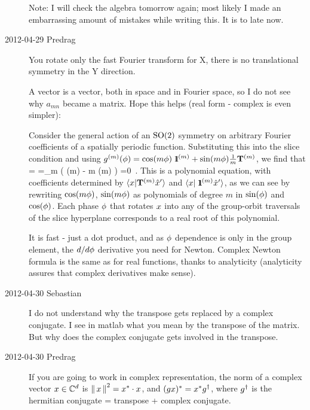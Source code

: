 \begin{description}
Note: I will check the algebra tomorrow again; most likely I made an
embarrassing amount of mistakes while writing this. It is to late now.

\item[2012-04-29 Predrag]
You rotate only the fast Fourier transform for X, there is no
translational symmetry in the Y direction.

A vector is a vector, both in space and in Fourier space, so I do not see
why $a_{mn}$ became a matrix. Hope this helps (real form - complex is even
simpler):

Consider the general action of an
$\textrm{SO}(2)$ symmetry on arbitrary Fourier coefficients of a spatially
periodic function. Substituting this into the slice
condition
and using $g^{(m)}({\bf \phi})=\cos(m{\bf \phi}){\ \hbox{{\rm 1}\kern-.6em\hbox{\rm 1}}}^{(m)} +\sin(m{\bf \phi})
\frac{1}{m}\mathbf{T}^{(m)}$, we find that
\bea
{}
=
\continue
=\sum\limits_m
   \left(
     \cos(m\gSpace)
  - m \sin(m\gSpace)
   \right)
   =0
\,.
\label{eq:so2sing}
\eea
This is a polynomial equation, with coefficients determined by
$\braket{\ssp}{\Lg^{(m)} \slicep}$ and $\braket{\ssp}{\id^{(m)}\slicep}$,
as we can see by rewriting $\cos(m{\bf \phi})$, $\sin(m{\bf \phi})$ as
polynomials of degree $m$ in $\sin({\bf \phi})$ and $\cos({\bf \phi})$. Each
phase ${\bf \phi}$ that rotates $x$ into any of the group-orbit
traversals of the slice hyperplane corresponds to a real root of this
polynomial.

It is fast - just a dot product, and as ${\bf \phi}$ dependence is only in
the group element, the $d/d{\bf \phi}$ derivative you need for Newton.
Complex Newton formula is the same as for real functions, thanks to
analyticity (analyticity assures that complex derivatives make sense).

\item[2012-04-30 Sebastian]
I do not understand why the transpose gets replaced by a complex
conjugate. I see in matlab what you mean by the transpose of the matrix.
But why does the complex conjugate gets involved in the transpose.

\item[2012-04-30 Predrag] If you are going to work in complex
representation, the norm of a complex vector $x \in \mathbb{C}^d$ is
$\left\Arrowvert \, x \, \right\Arrowvert^2 = x^* \cdot x$, and $(gx)^*
=x^*g^\dagger$, where $g^\dagger$ is the hermitian conjugate
= transpose + complex conjugate.


\end{description}
